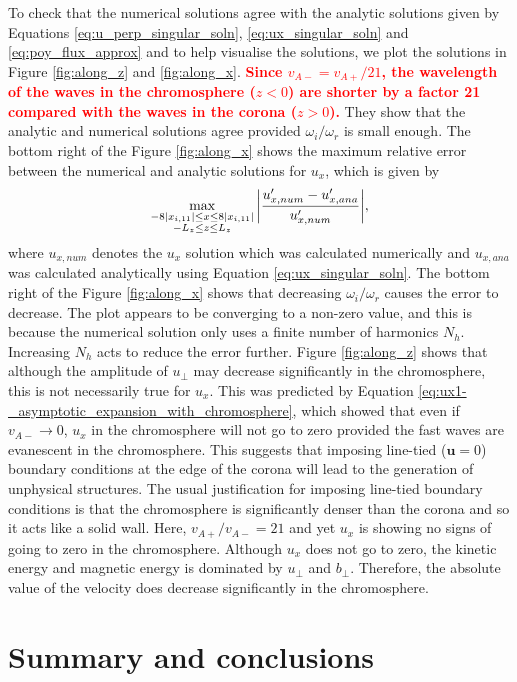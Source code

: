 \documentclass[linenumbers]{aastex63}
\let\vec\boldsymbol
\newcommand{\alexedit}[1]{\textcolor{red}{\textbf{#1}}}
\begin{document}
To check that the numerical solutions agree with the analytic solutions given by Equations \eqref{eq:u_perp_singular_soln}, \eqref{eq:ux_singular_soln} and \eqref{eq:poy_flux_approx} and to help visualise the solutions, we plot the solutions in Figure \ref{fig:along_z} and \ref{fig:along_x}. \alexedit{Since $v_{A-} = v_{A+}/21$, the wavelength of the waves in the chromosphere ($z<0$) are shorter by a factor 21 compared with the waves in the corona ($z>0$).} They show that the analytic and numerical solutions agree provided $\omega_i/\omega_r$ is small enough. The bottom right of the Figure \ref{fig:along_x} shows the maximum relative error between the numerical and analytic solutions for $u_x$, which is given by
\[
\max_{\substack{-8|x_{i,11}|\le x\le 8|x_{i,11}| \\ -L_z\le z \le L_z}}\abs{\frac{u_{x,num}'-u_{x,ana}'}{u_{x,num}'}},
\]
where $u_{x,num}$ denotes the $u_x$ solution which was calculated numerically and $u_{x,ana}$ was calculated analytically using Equation \eqref{eq:ux_singular_soln}. The bottom right of the Figure \ref{fig:along_x} shows that decreasing $\omega_i/\omega_r$ causes the error to decrease. The plot appears to be converging to a non-zero value, and this is because the numerical solution only uses a finite number of harmonics $N_h$. Increasing $N_h$ acts to reduce the error further. Figure \ref{fig:along_z} shows that although the amplitude of $u_\perp$ may decrease significantly in the chromosphere, this is not necessarily true for $u_x$. This was predicted by Equation \eqref{eq:ux1-_asymptotic_expansion_with_chromosphere}, which showed that even if $v_{A-}\rightarrow0$, $u_x$ in the chromosphere will not go to zero provided the fast waves are evanescent in the chromosphere. This suggests that imposing line-tied ($\vec{u}=0$) boundary conditions at the edge of the corona will lead to the generation of unphysical structures. The usual justification for imposing line-tied boundary conditions is that the chromosphere is significantly denser than the corona and so it acts like a solid wall. Here, $v_{A+}/v_{A-}=21$ and yet $u_x$ is showing no signs of going to zero in the chromosphere. Although $u_x$ does not go to zero, the kinetic energy and magnetic energy is dominated by $u_\perp$ and $b_\perp$. Therefore, the absolute value of the velocity does decrease significantly in the chromosphere.

\section{Summary and conclusions}
\label{sec:summary}
\end{document}
